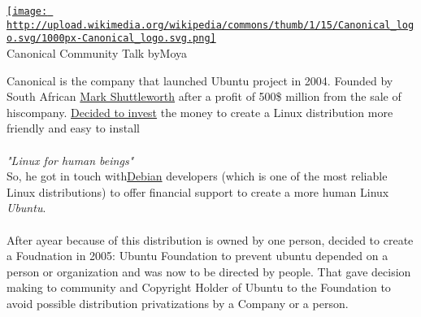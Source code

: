 
\begin{tabular}\href{http://upload.wikimedia.org/wikipedia/commons/thumb/1/15/Canonical_logo.svg/1000px-Canonical_logo.svg.png}{
\texttt{[image: http://upload.wikimedia.org/wikipedia/commons/thumb/1/15/Canonical\_logo.svg/1000px-Canonical\_logo.svg.png]}} \\ 
Canonical Community Talk by\nolinebreakRodrigo Moya
\end{tabular} Canonical is the company that launched Ubuntu project in 2004. Founded by South African \href{http://www.markshuttleworth.com/}{Mark Shuttleworth} after a profit of 500\$ million from the sale of his\nolinebreak\nolinebreaksecurity company. \href{http://www.markshuttleworth.com/archives/4}{Decided to invest} the money to create a Linux distribution more friendly and easy to install
\\
\\\textit{"Linux for human beings"}
\\ So, he got in touch with\nolinebreak\href{http://www.debian.org/index.html}{Debian} developers (which is one of the most reliable Linux distributions) to offer financial support to create a more human Linux \textit{Ubuntu}.
\\
\\ After a\nolinebreak\nolinebreakcontroversial year because of this distribution is owned by one person, decided to create a Foudnation in 2005: Ubuntu Foundation to prevent ubuntu depended on a person or organization and was now to be directed by people. That gave decision making to community and Copyright Holder of Ubuntu to the Foundation to avoid possible distribution privatizations by a Company or a person.
\\

